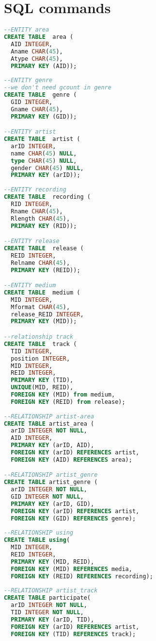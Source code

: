 \documentclass[11pt]{article} %
\begin{document}
\section{SQL commands}
\begin{lstlisting}[language=SQL, keywordstyle=\color{blue!70},
commentstyle=\color{red!50!green!50!blue!50},
rulesepcolor=\color{red!20!green!20!blue!20},
frame=shadowbox]
--ENTITY area
CREATE TABLE  area (
  AID INTEGER,
  Aname CHAR(45),
  Atype CHAR(45),
  PRIMARY KEY (AID));
  
--ENTITY genre
--we don't need gcount in genre
CREATE TABLE  genre (
  GID INTEGER,
  Gname CHAR(45),
  PRIMARY KEY (GID));

--ENTITY artist
CREATE TABLE  artist (
  arID INTEGER,
  name CHAR(45) NULL,
  type CHAR(45) NULL,
  gender CHAR(45) NULL,
  PRIMARY KEY (arID));
  
--ENTITY recording
CREATE TABLE  recording (
  RID INTEGER,
  Rname CHAR(45),
  Rlength CHAR(45),
  PRIMARY KEY (RID));

--ENTITY release
CREATE TABLE  release (
  REID INTEGER,
  Relname CHAR(45),
  PRIMARY KEY (REID));

--ENTITY medium
CREATE TABLE  medium (
  MID INTEGER,
  Mformat CHAR(45),
  release_REID INTEGER,
  PRIMARY KEY (MID));

--relationship track
CREATE TABLE  track (
  TID INTEGER,
  position INTEGER,
  MID INTEGER,
  REID INTEGER,
  PRIMARY KEY (TID),
  UNIQUE(MID, REID),
  FOREIGN KEY (MID) from medium,
  FOREIGN KEY (REID) from release);
    
--RELATIONSHIP artist-area
CREATE TABLE artist_area (
  arID INTEGER NOT NULL,
  AID INTEGER,
  PRIMARY KEY (arID, AID),
  FOREIGN KEY (arID) REFERENCES artist,
  FOREIGN KEY (AID) REFERENCES area);

--RELATIONSHIP artist_genre
CREATE TABLE artist_genre (
  arID INTEGER NOT NULL,
  GID INTEGER NOT NULL,
  PRIMARY KEY (arID, GID),
  FOREIGN KEY (arID) REFERENCES artist,
  FOREIGN KEY (GID) REFERENCES genre);
    
--RELATIONSHIP using
CREATE TABLE using(
  MID INTEGER,
  REID INTEGER,
  PRIMARY KEY (MID, REID),
  FOREIGN KEY (MID) REFERENCES media,
  FOREIGN KEY (REID) REFERENCES recording);
  
--RELATIONSHIP artist_track
CREATE TABLE participate(
  arID INTEGER NOT NULL,
  TID INTEGER NOT NULL,
  PRIMARY KEY (arID, TID),
  FOREIGN KEY (arID) REFERENCES artist,
  FOREIGN KEY (TID) REFERENCES track);
\end{lstlisting}
\end{document}

